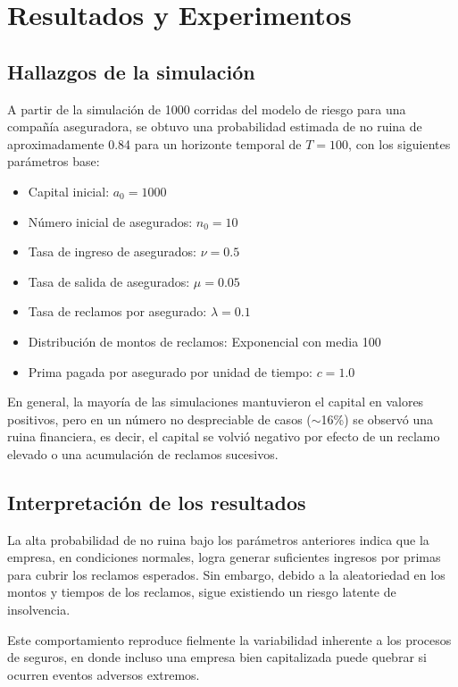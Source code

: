 \documentclass{article}
\begin{document}
\section{Resultados y Experimentos}

\subsection{Hallazgos de la simulación}
A partir de la simulación de 1000 corridas del modelo de riesgo para una compañía aseguradora, se obtuvo una probabilidad estimada de no ruina de aproximadamente 0.84 para un horizonte temporal de $T = 100$, con los siguientes parámetros base:

\begin{itemize}
  \item Capital inicial: $a_0 = 1000$
  \item Número inicial de asegurados: $n_0 = 10$
  \item Tasa de ingreso de asegurados: $\nu = 0.5$
  \item Tasa de salida de asegurados: $\mu = 0.05$
  \item Tasa de reclamos por asegurado: $\lambda = 0.1$
  \item Distribución de montos de reclamos: Exponencial con media 100
  \item Prima pagada por asegurado por unidad de tiempo: $c = 1.0$
\end{itemize}

En general, la mayoría de las simulaciones mantuvieron el capital en valores positivos, pero en un número no despreciable de casos ($\sim$16\%) se observó una ruina financiera, es decir, el capital se volvió negativo por efecto de un reclamo elevado o una acumulación de reclamos sucesivos.

\subsection{Interpretación de los resultados}
La alta probabilidad de no ruina bajo los parámetros anteriores indica que la empresa, en condiciones normales, logra generar suficientes ingresos por primas para cubrir los reclamos esperados. Sin embargo, debido a la aleatoriedad en los montos y tiempos de los reclamos, sigue existiendo un riesgo latente de insolvencia.

Este comportamiento reproduce fielmente la variabilidad inherente a los procesos de seguros, en donde incluso una empresa bien capitalizada puede quebrar si ocurren eventos adversos extremos.
\end{document}
